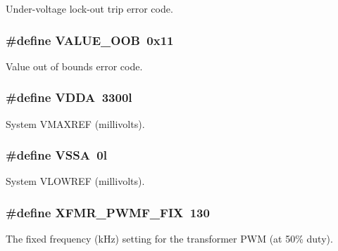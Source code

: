 Under-\/voltage lock-\/out trip error code. \hypertarget{a00043_a055087c0064c322a05e443b47479bfe1}{
\subsubsection[{V\-A\-L\-U\-E\-\_\-\-O\-O\-B}]{\setlength{\rightskip}{0pt plus 5cm}\#define V\-A\-L\-U\-E\-\_\-\-O\-O\-B~0x11}}\label{a00043_a055087c0064c322a05e443b47479bfe1}
Value out of bounds error code. \hypertarget{a00043_a2d52976aedaedf74a90019a689170620}{
\subsubsection[{V\-D\-D\-A}]{\setlength{\rightskip}{0pt plus 5cm}\#define V\-D\-D\-A~3300l}}\label{a00043_a2d52976aedaedf74a90019a689170620}
System V\-M\-A\-X\-R\-E\-F (millivolts). \hypertarget{a00043_a3c2e957a61cfa19e31e8477fe3aacab8}{
\subsubsection[{V\-S\-S\-A}]{\setlength{\rightskip}{0pt plus 5cm}\#define V\-S\-S\-A~0l}}\label{a00043_a3c2e957a61cfa19e31e8477fe3aacab8}
System V\-L\-O\-W\-R\-E\-F (millivolts). \hypertarget{a00043_a39c57f59314d3cc076ca98898f227b46}{
\subsubsection[{X\-F\-M\-R\-\_\-\-P\-W\-M\-F\-\_\-\-F\-I\-X}]{\setlength{\rightskip}{0pt plus 5cm}\#define X\-F\-M\-R\-\_\-\-P\-W\-M\-F\-\_\-\-F\-I\-X~130}}\label{a00043_a39c57f59314d3cc076ca98898f227b46}
The fixed frequency (k\-Hz) setting for the transformer P\-W\-M (at 50\% duty). 